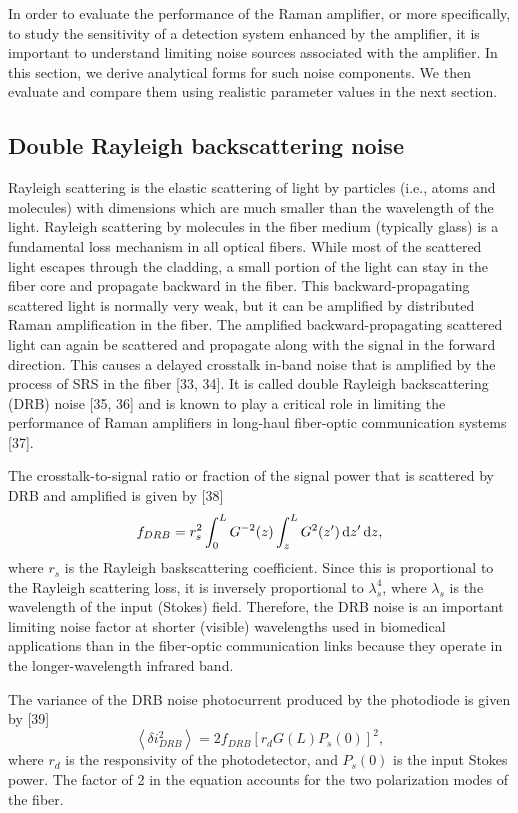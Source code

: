 In order to evaluate the performance of the Raman amplifier, or more specifically, to study the sensitivity of a detection system enhanced by the amplifier, it is important to understand limiting noise sources associated with the amplifier. In this section, we derive analytical forms for such noise components. We then evaluate and compare them using realistic parameter values in the next section.

\subsection{Double Rayleigh backscattering noise}

Rayleigh scattering is the elastic scattering of light by particles (i.e., atoms and molecules) with dimensions which are much smaller than the wavelength of the light. Rayleigh scattering by molecules in the fiber medium (typically glass) is a fundamental loss mechanism in all optical fibers. While most of the scattered light escapes through the cladding, a small portion of the light can stay in the fiber core and propagate backward in the fiber. This backward-propagating scattered light is normally very weak, but it can be amplified by distributed Raman amplification in the fiber. The amplified backward-propagating scattered light can again be scattered and propagate along with the signal in the forward direction. This causes a delayed crosstalk in-band noise that is amplified by the process of SRS in the fiber [33, 34]. It is called double Rayleigh backscattering (DRB) noise [35, 36] and is known to play a critical role in limiting the performance of Raman amplifiers in long-haul fiber-optic communication systems [37].

The crosstalk-to-signal ratio or fraction of the signal power that is scattered by DRB and amplified is given by [38]
\begin{equation}
f_{DRB} = r_s^2 \int_0^L G^{-2}(z) \int_z^L{G^2(z') \,\mathrm{d} z'} \,\mathrm{d} z,
\end{equation}
where $r_s$ is the Rayleigh baskscattering coefficient. Since this is proportional to the Rayleigh scattering loss, it is inversely proportional to $\lambda_s^4$, where $\lambda_s$ is the wavelength of the input (Stokes) field. Therefore, the DRB noise is an important limiting noise factor at shorter (visible) wavelengths used in biomedical applications than in the fiber-optic communication links because they operate in the longer-wavelength infrared band.

The variance of the DRB noise photocurrent produced by the photodiode is given by [39]
\begin{equation}
\left\langle \delta i_{DRB}^2\right\rangle = 2 f_{DRB} [r_d G(L) P_s(0)]^2,
\end{equation}
where $r_d$ is the responsivity of the photodetector, and $P_s(0)$ is the input Stokes power. The factor of 2 in the equation accounts for the two polarization modes of the fiber.

